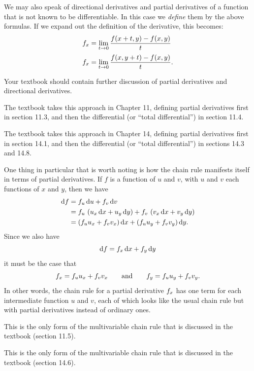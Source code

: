 \documentclass[12pt]{amsart}
\begin{document}
We may also speak of directional derivatives and partial derivatives of a function that is not known to be differentiable.
In this case we \emph{define} them by the above formulas.
If we expand out the definition of the derivative, this becomes:
\begin{align}
  {f}_{x} &= \lim_{t\to 0} \frac{f(x+t,y) - f(x,y)}{t}\\[2pt]
  {f}_{x} &= \lim_{t\to 0} \frac{f(x,y+t) - f(x,y)}{t}.
\end{align}
\begin{notextbook}Your textbook should contain further discussion of partial derivatives and directional derivatives.\end{notextbook}%
\begin{stewart}The textbook takes this approach in Chapter 11, defining partial derivatives first in section 11.3, and then the differential (or ``total differential'') in section 11.4.\end{stewart}%
\begin{hugheshallett}The textbook takes this approach in Chapter 14, defining partial derivatives first in section 14.1, and then the differential (or ``total differential'') in sections 14.3 and 14.8.\end{hugheshallett}

One thing in particular that is worth noting is how the chain rule manifests itself in terms of partial derivatives.
If $f$ is a function of $u$ and $v$, with $u$ and $v$ each functions of $x$ and $y$, then we have
\begin{align*}
  {\ensuremath{\mathrm{d} f}} &= {f}_{u}\,{\mathrm{d} u} + {f}_{v}\,{\mathrm{d} v}\\
  &= {f}_{u}\,\left({u}_{x}\,{\mathrm{d} x} + {u}_{y}\,{\mathrm{d} y}\right) + {f}_{v}\,\left({v}_{x}\,{\mathrm{d} x} + {v}_{y}\,{\mathrm{d} y}\right)\\
  &= \left({f}_{u}{u}_{x}+ {f}_{v}{v}_{x}\right){\mathrm{d} x} + \left({f}_{u}{u}_{y}+ {f}_{v}{v}_{y}\right){\mathrm{d} y}.
\end{align*}
Since we also have
\[ {\mathrm{d} f} = {f}_{x}\,{\mathrm{d} x} + {f}_{y}\,{\mathrm{d} y} \]
it must be the case that
\begin{equation}\label{eq:partial-chain-rule}
  {f}_{x} = {f}_{u}{u}_{x}+ {f}_{v}{v}_{x}
  \qquad\text{and}\qquad
  {f}_{y} = {f}_{u}{u}_{y}+ {f}_{v}{v}_{y}.
\end{equation}
In other words, the chain rule for a partial derivative ${f}_{x}$ has one term for each intermediate function $u$ and $v$, each of which looks like the usual chain rule but with partial derivatives instead of ordinary ones.
\begin{stewart}This is the only form of the multivariable chain rule that is discussed in the textbook (section 11.5).\end{stewart}%
\begin{hugheshallett}This is the only form of the multivariable chain rule that is discussed in the textbook (section 14.6).\end{hugheshallett}
\end{document}
